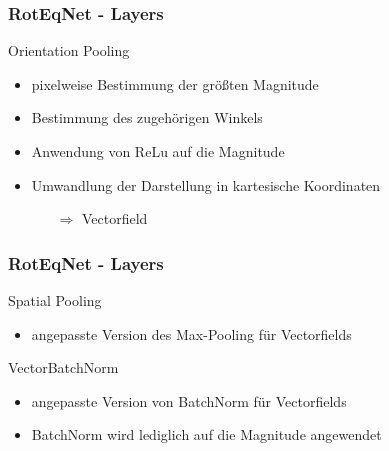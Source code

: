 \begin{frame}
	\frametitle{RotEqNet - Layers}
	\begin{block}{Orientation Pooling}
		\begin{itemize}
			\item pixelweise Bestimmung der größten Magnitude
			\item Bestimmung des zugehörigen Winkels
			\item Anwendung von ReLu auf die Magnitude
			\item Umwandlung der Darstellung in kartesische Koordinaten
			\begin{itemize} 
				\item[$ \Rightarrow $] \normalsize Vectorfield
			\end{itemize}
		\end{itemize}
	\end{block}
\end{frame}

\begin{frame}
	\frametitle{RotEqNet - Layers}
	\begin{block}{Spatial Pooling}
			\begin{itemize}
				\item angepasste Version des Max-Pooling für Vectorfields
			\end{itemize}
	\end{block}
	\begin{block}{VectorBatchNorm}
		\begin{itemize}
			\item angepasste Version von BatchNorm für Vectorfields
			\item BatchNorm wird lediglich auf die Magnitude angewendet
		\end{itemize}
	\end{block}
\end{frame}

